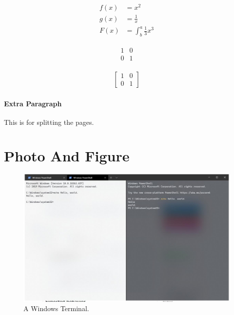 \documentclass{article}
\begin{document}
\begin{align*}
    f(x) & = x^2                     \\
    g(x) & = \frac{1}{x}             \\
    F(x) & = \int^a_b \frac{1}{3}x^3
\end{align*}

\begin{align*}
    \begin{matrix}
        1 & 0 \\
        0 & 1
    \end{matrix}
\end{align*}

\begin{align*}
    \left[
        \begin{matrix}
            1 & 0 \\
            0 & 1
        \end{matrix}
        \right]
\end{align*}

\paragraph{Extra Paragraph}

This is for splitting the pages.

\section{Photo And Figure}

\begin{figure}[!ht]
    \includegraphics[width=\linewidth]{echos.jpg}
    \caption{A Windows Terminal.}
    \label{fig:Terminal}
\end{figure}
\end{document}
